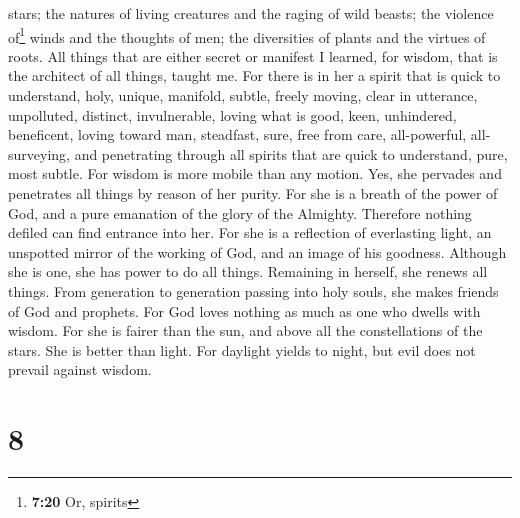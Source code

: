 stars;  the natures of living creatures and the raging of
wild beasts; the violence of\footnote{\textbf{7:20} Or, spirits} winds
and the thoughts of men; the diversities of plants and the virtues of
roots.  All things that are either secret or manifest I
learned,  for wisdom, that is the architect of all
things, taught me. For there is in her a spirit that is quick to
understand, holy, unique, manifold, subtle, freely moving, clear in
utterance, unpolluted, distinct, invulnerable, loving what is good,
keen, unhindered,  beneficent, loving toward man,
steadfast, sure, free from care, all-powerful, all-surveying, and
penetrating through all spirits that are quick to understand, pure, most
subtle.  For wisdom is more mobile than any motion. Yes,
she pervades and penetrates all things by reason of her purity.
 For she is a breath of the power of God, and a pure
emanation of the glory of the Almighty. Therefore nothing defiled can
find entrance into her.  For she is a reflection of
everlasting light, an unspotted mirror of the working of God, and an
image of his goodness.  Although she is one, she has
power to do all things. Remaining in herself, she renews all things.
From generation to generation passing into holy souls, she makes friends
of God and prophets.  For God loves nothing as much as
one who dwells with wisdom.  For she is fairer than the
sun, and above all the constellations of the stars. She is better than
light.  For daylight yields to night, but evil does not
prevail against wisdom.

\hypertarget{section-7}{%
\section{8}\label{section-7}}

